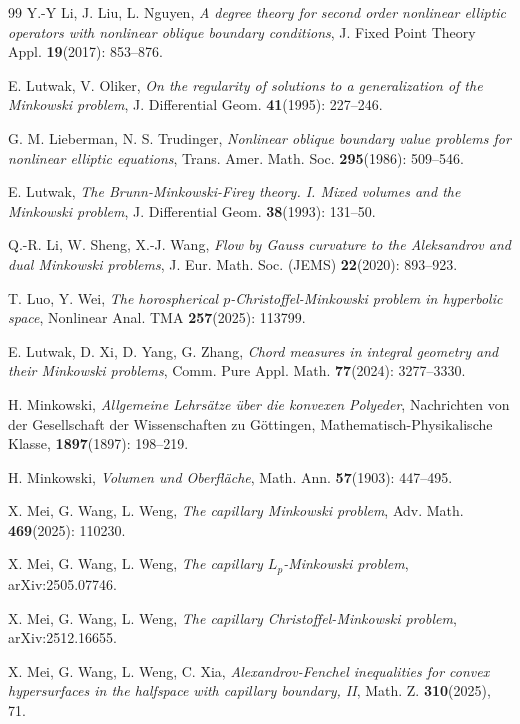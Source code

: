 \documentclass[12pt]{amsart}
\numberwithin{equation}{section}
\newcommand{\8}{\infty}
\begin{document}
\begin{thebibliography}{99}
 Y.-Y Li, J. Liu, L. Nguyen, \textit{A degree theory for second order nonlinear elliptic operators with nonlinear oblique boundary conditions}, J. Fixed Point Theory Appl. \textbf{19}(2017): 853--876.

E. Lutwak, V. Oliker, \textit{On the regularity of solutions to a generalization of the Minkowski problem}, J. Differential Geom. \textbf{41}(1995): 227--246.

G. M. Lieberman, N. S. Trudinger, \textit{Nonlinear oblique boundary value problems for nonlinear elliptic equations}, Trans. Amer. Math. Soc. \textbf{295}(1986): 509--546.

E. Lutwak, \textit{The Brunn-Minkowski-Firey theory. I. Mixed volumes and the Minkowski problem}, J. Differential Geom. \textbf{38}(1993): 131--50.

Q.-R. Li, W. Sheng, X.-J. Wang, \textit{Flow by Gauss curvature to the Aleksandrov and dual Minkowski problems}, J. Eur. Math. Soc. (JEMS) \textbf{22}(2020): 893--923.

T. Luo, Y. Wei, \textit{The horospherical $p$-Christoffel-Minkowski problem in hyperbolic space}, Nonlinear Anal. TMA \textbf{257}(2025): 113799.

E. Lutwak, D. Xi, D. Yang, G. Zhang, \textit{Chord measures in integral geometry and their Minkowski problems}, Comm. Pure Appl. Math. \textbf{77}(2024): 3277--3330.

H. Minkowski, \textit{Allgemeine Lehrs\"{a}tze \"{u}ber die konvexen Polyeder}, Nachrichten von der Gesellschaft der Wissenschaften zu G\"{o}ttingen, Mathematisch-Physikalische Klasse, \textbf{1897}(1897): 198--219.

H. Minkowski, \textit{Volumen und Oberfl\"ache}, Math. Ann. \textbf{57}(1903): 447--495.

X. Mei, G. Wang, L. Weng, \textit{The capillary Minkowski problem}, Adv. Math. \textbf{469}(2025): 110230.

X. Mei, G. Wang, L. Weng, \textit{The capillary $L_p$-Minkowski problem}, arXiv:2505.07746.

X. Mei, G. Wang, L. Weng, \textit{The capillary Christoffel-Minkowski problem}, arXiv:2512.16655.

X. Mei, G. Wang, L. Weng, C. Xia, \textit{Alexandrov-Fenchel inequalities for convex hypersurfaces in the halfspace with capillary boundary, II}, Math. Z. \textbf{310}(2025), 71.


\end{thebibliography}
\end{document}
